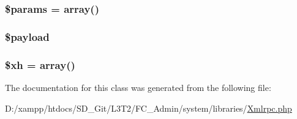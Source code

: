 \subsubsection[{\$params}]{\setlength{\rightskip}{0pt plus 5cm}\$params = array()}\label{class_x_m_l___r_p_c___message_afe68e6fbe7acfbffc0af0c84a1996466}
\hypertarget{class_x_m_l___r_p_c___message_ab6c08f2335783abfa1bce5d22fb3466e}{}
\subsubsection[{\$payload}]{\setlength{\rightskip}{0pt plus 5cm}\$payload}\label{class_x_m_l___r_p_c___message_ab6c08f2335783abfa1bce5d22fb3466e}
\hypertarget{class_x_m_l___r_p_c___message_aad3b174789357e147f0daa5b69930ac8}{}
\subsubsection[{\$xh}]{\setlength{\rightskip}{0pt plus 5cm}\$xh = array()}\label{class_x_m_l___r_p_c___message_aad3b174789357e147f0daa5b69930ac8}


The documentation for this class was generated from the following file\+:\begin{DoxyCompactItemize}
\item 
D\+:/xampp/htdocs/\+S\+D\+\_\+\+Git/\+L3\+T2/\+F\+C\+\_\+\+Admin/system/libraries/\hyperlink{_xmlrpc_8php}{Xmlrpc.\+php}\end{DoxyCompactItemize}
